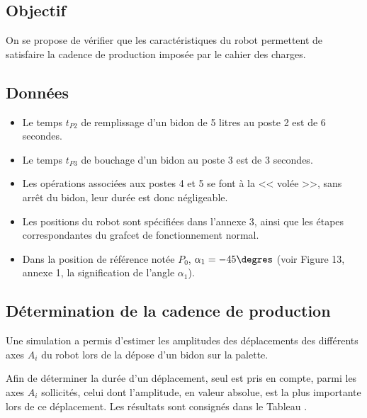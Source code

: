 \vspace{.4cm}
\fi


\subsection{Objectif }

\ifprof
\else
On se propose de vérifier que les caractéristiques du robot permettent de satisfaire la cadence 
de production imposée par le cahier des charges. 
\fi

\subsection{Données \label{sec:2-2}}

\ifprof
\else

\begin{itemize}
\item Le temps $t_{P2}$ de remplissage d’un bidon de 5 litres au poste 2 est de 6 secondes. 
\item Le temps $t_{P3}$ de bouchage d’un bidon au poste 3 est de 3 secondes. 
\item Les opérations associées aux postes 4 et 5 se font à la << volée >>, sans arrêt du bidon,
leur durée est donc négligeable. 
\item Les positions du robot sont spécifiées dans l’annexe 3, 
ainsi que les étapes correspondantes du grafcet de fonctionnement normal. 
\item Dans la position de référence notée $P_0$, $\alpha_1 = -45\degres$ (voir Figure 13, annexe 1, la signification de l’angle $\alpha_1$). 
\end{itemize}
\fi

\subsection{Détermination de la cadence de production}
\ifprof
\else

Une simulation a permis d’estimer les amplitudes des déplacements des différents axes $A_i$ du robot lors de la dépose d’un bidon sur la palette. 

Afin de déterminer la durée d’un déplacement, seul est pris en compte, parmi les axes $A_i$ sollicités, celui dont l’amplitude, en valeur absolue, est la plus importante lors de ce déplacement. Les résultats sont consignés dans le Tableau \label{kuka:tab:02}. 

